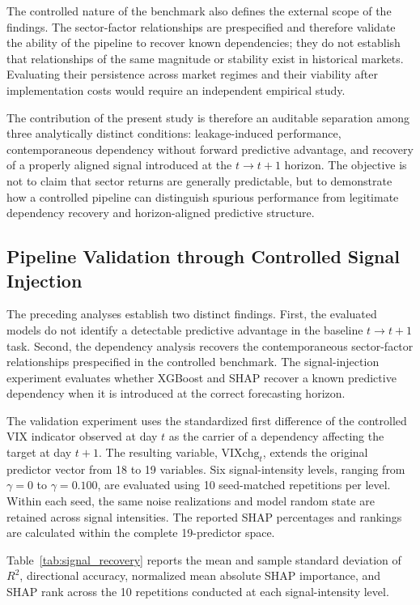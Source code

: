 \documentclass[utf8]{FrontiersinHarvard} %
\begin{document}
The controlled nature of the benchmark also defines the external scope of the findings. The sector-factor relationships are prespecified and therefore validate the ability of the pipeline to recover known dependencies; they do not establish that relationships of the same magnitude or stability exist in historical markets. Evaluating their persistence across market regimes and their viability after implementation costs would require an independent empirical study.

The contribution of the present study is therefore an auditable separation among three analytically distinct conditions: leakage-induced performance, contemporaneous dependency without forward predictive advantage, and recovery of a properly aligned signal introduced at the \(t\rightarrow t+1\) horizon. The objective is not to claim that sector returns are generally predictable, but to demonstrate how a controlled pipeline can distinguish spurious performance from legitimate dependency recovery and horizon-aligned predictive structure.

\subsection{Pipeline Validation through Controlled Signal Injection}
\label{subsec:signal_injection_results}

The preceding analyses establish two distinct findings. First, the evaluated models do not identify a detectable predictive advantage in the baseline \(t\rightarrow t+1\) task. Second, the dependency analysis recovers the contemporaneous sector-factor relationships prespecified in the controlled benchmark. The signal-injection experiment evaluates whether XGBoost and SHAP recover a known predictive dependency when it is introduced at the correct forecasting horizon.

The validation experiment uses the standardized first difference of the controlled VIX indicator observed at day \(t\) as the carrier of a dependency affecting the target at day \(t+1\). The resulting variable, \(\mathrm{VIXchg}_t\), extends the original predictor vector from 18 to 19 variables. Six signal-intensity levels, ranging from \(\gamma=0\) to \(\gamma=0.100\), are evaluated using 10 seed-matched repetitions per level. Within each seed, the same noise realizations and model random state are retained across signal intensities. The reported SHAP percentages and rankings are calculated within the complete 19-predictor space.

Table~\ref{tab:signal_recovery} reports the mean and sample standard deviation of \(R^2\), directional accuracy, normalized mean absolute SHAP importance, and SHAP rank across the 10 repetitions conducted at each signal-intensity level.
\end{document}
